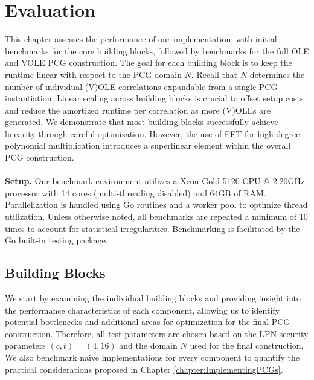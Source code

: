 \chapter{Evaluation}
\label{chapter:evaluation}
This chapter assesses the performance of our implementation, with initial benchmarks for the core building blocks, followed by benchmarks for the full OLE and VOLE PCG construction. The goal for each building block is to keep the runtime linear with respect to the PCG domain $N$. Recall that $N$ determines the number of individual (V)OLE correlations expandable from a single PCG instantiation. Linear scaling across building blocks is crucial to offset setup costs and reduce the amortized runtime per correlation as more (V)OLEs are generated. We demonstrate that most building blocks successfully achieve linearity through careful optimization. However, the use of FFT for high-degree polynomial multiplication introduces a superlinear element within the overall PCG construction.
\\\\
\textbf{Setup.} Our benchmark environment utilizes a Xeon Gold 5120 CPU @ 2.20GHz processor with 14 cores (multi-threading disabled) and 64GB of RAM. Parallelization is handled using Go routines and a worker pool to optimize thread utilization. Unless otherwise noted, all benchmarks are repeated a minimum of 10 times to account for statistical irregularities. Benchmarking is facilitated by the Go built-in testing package. 

\section{Building Blocks}
We start by examining the individual building blocks and providing insight into the performance characteristics of each component, allowing us to identify potential bottlenecks and additional areas for optimization for the final PCG construction. Therefore, all test parameters are chosen based on the LPN security parameters $(c,t)=(4,16)$ and the domain $N$ used for the final construction. We also benchmark naive implementations for every component to quantify the practical considerations proposed in Chapter \ref{chapter:ImplementingPCGs}.

